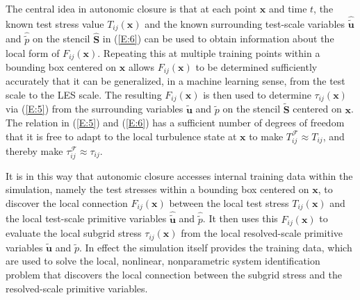 The central idea in autonomic closure is that at each point $\mathbf{x}$ and time $t$, the known test stress value  $T_{ij}(\mathbf{x})$ and the known surrounding test-scale variables   $\widehat{\widetilde{\mathbf{u}}}$  and  $\widehat{{\widetilde{p}}}$   on the stencil  ${\widehat{\mathbf{S}}}$ in (\ref{E:6}) can be used to obtain information about the local form of $F_{ij}(\mathbf{x})$. Repeating this at multiple training points within a bounding box centered on $\mathbf{x}$ allows  $F_{ij}(\mathbf{x})$ to be determined sufficiently accurately that it can be generalized, in a machine learning sense, from the test scale to the LES scale. The resulting  $F_{ij}(\mathbf{x})$ is then used to determine $\tau_{ij}(\mathbf{x})$  via (\ref{E:5}) from the surrounding variables   $\widetilde{\mathbf{u}}$  and  ${\widetilde{p}}$   on the stencil  $\widetilde{\mathbf{S}}$ centered on $\mathbf{x}$. The relation   in (\ref{E:5}) and (\ref{E:6}) has a sufficient number of degrees of freedom that it is free to adapt to the local turbulence state at $\mathbf{x}$  to make  $T_{ij}^{\mathcal{F}} \approx T_{ij}$, and thereby make $\tau_{ij}^{\mathcal{F}} \approx \tau_{ij}$.

It is in this way that autonomic closure accesses internal training data within the simulation, namely the test stresses within a bounding box centered on $\mathbf{x}$, to discover the local connection  $F_{ij}(\mathbf{x})$  between the local test stress $T_{ij}(\mathbf{x})$   and the local test-scale primitive variables   $\widehat{\widetilde{\mathbf{u}}}$  and  $\widehat{{\widetilde{p}}}$. It then uses this $F_{ij}(\mathbf{x})$  to evaluate the local subgrid stress $\tau_{ij}(\mathbf{x})$  from the local resolved-scale primitive variables   $\widetilde{\mathbf{u}}$  and  ${\widetilde{p}}$. In effect the simulation itself provides the training data, which are used to solve the local, nonlinear, nonparametric system identification problem that discovers the local connection between the subgrid stress and the resolved-scale primitive variables. 

